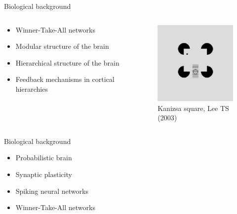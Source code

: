 \documentclass[aspectratio=169]{beamer}
\begin{document}
\begin{frame}{Biological background}
  \begin{columns}[onlytextwidth]
	\begin{column}{0.5\textwidth}
      \begin{itemize}
        \item Winner-Take-All networks
        \item Modular structure of the brain
        \item Hierarchical structure of the brain
        \item Feedback mechanisms in cortical hierarchies
      \end{itemize}
	\end{column}
	\begin{column}{0.5\textwidth}
      \begin{figure}
        \includegraphics[width=0.4\linewidth]{../Latex/figures/kanizsaSquare.PNG}
      \\   \footnotesize Kanizsa square, Lee TS (2003)
      \end{figure} 
  	\end{column}
  \end{columns}
\end{frame}

\begin{frame}{Biological background}
      \begin{itemize}
        \item Probabilistic brain
        \item Synaptic plasticity
        \item Spiking neural networks
        \item Winner-Take-All networks
      \end{itemize}
\end{frame}
\end{document}
